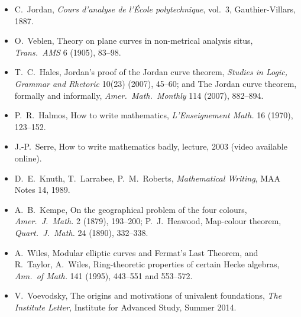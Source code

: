 \begin{itemize}
\item C.~Jordan, \emph{Cours d'analyse de l'\'Ecole polytechnique}, vol.~3, Gauthier-Villars, 1887.
\item O.~Veblen, Theory on plane curves in non-metrical analysis situs, \emph{Trans.\ AMS} 6 (1905), 83--98.
\item T.~C.~Hales, Jordan's proof of the Jordan curve theorem, \emph{Studies in Logic, Grammar and Rhetoric} 10(23) (2007), 45--60; and The Jordan curve theorem, formally and informally, \emph{Amer.\ Math.\ Monthly} 114 (2007), 882--894.
\item P.~R.~Halmos, How to write mathematics, \emph{L'Enseignement Math.} 16 (1970), 123--152.
\item J.-P.~Serre, How to write mathematics badly, lecture, 2003 (video available online).
\item D.~E.~Knuth, T.~Larrabee, P.~M.~Roberts, \emph{Mathematical Writing}, MAA Notes 14, 1989.
\item A.~B.~Kempe, On the geographical problem of the four colours, \emph{Amer.\ J.\ Math.} 2 (1879), 193--200; P.~J.~Heawood, Map-colour theorem, \emph{Quart.\ J.\ Math.} 24 (1890), 332--338.
\item A.~Wiles, Modular elliptic curves and Fermat's Last Theorem, and R.~Taylor, A.~Wiles, Ring-theoretic properties of certain Hecke algebras, \emph{Ann.\ of Math.} 141 (1995), 443--551 and 553--572.
\item V.~Voevodsky, The origins and motivations of univalent foundations, \emph{The Institute Letter}, Institute for Advanced Study, Summer 2014.
\end{itemize}
